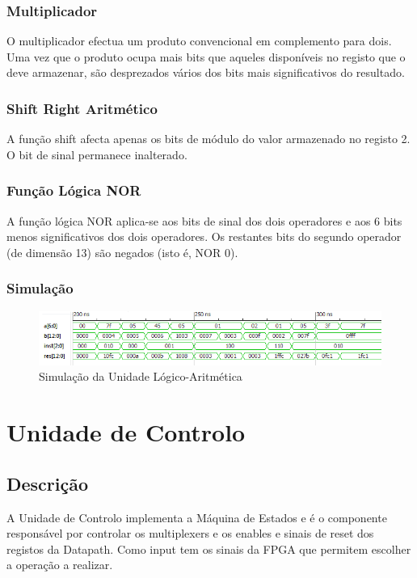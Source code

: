 \documentclass[a4paper]{article}
\begin{document}
\subsubsection{Multiplicador}
O multiplicador efectua um produto convencional em complemento para dois. Uma vez que o produto ocupa mais bits que aqueles disponíveis no registo que o deve armazenar, são desprezados vários dos bits mais significativos do resultado.

\subsubsection{Shift Right Aritmético}
A função shift afecta apenas os bits de módulo do valor armazenado no registo 2. O bit de sinal permanece inalterado.

\subsubsection{Função Lógica NOR}
A função lógica NOR aplica-se aos bits de sinal dos dois operadores e aos 6 bits menos significativos dos dois operadores. Os restantes bits do segundo operador (de dimensão 13) são negados (isto é, NOR 0).

\subsubsection{Simulação}

\begin{table}

\end{table}

\begin{figure}[h]
	\centering
	\includegraphics[width=\textwidth]{ALU_sim}
	\caption{Simulação da Unidade Lógico-Aritmética}
	\label{fig:ALUsim}
\end{figure}
\pagebreak


\section{Unidade de Controlo}
\subsection{Descrição}
A Unidade de Controlo implementa a Máquina de Estados e é o componente responsável por controlar os multiplexers e os enables e sinais de reset dos registos da Datapath. Como input tem os sinais da FPGA que permitem escolher a operação a realizar.
\end{document}
